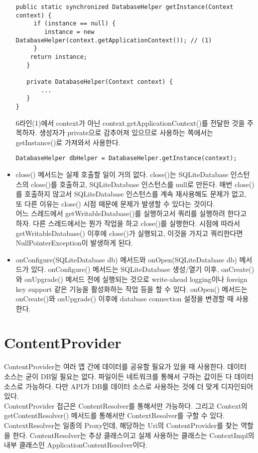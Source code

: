\begin{itemize}
\begin{lstlisting}[frame=single]
  public static synchronized DatabaseHelper getInstance(Context context) {
     if (instance == null) {
        instance = new DatabaseHelper(context.getApplicationContext()); // (1)
     }
    return instance;
   }
 
   private DatabaseHelper(Context context) {
       ...
   }
}
\end{lstlisting}
6라인(1)에서 context가 아닌 context.getApplicationContext()를 전달한 것을 주목하자.
생성자가 private으로 감추어져 있으므로 사용하는 쪽에서는 getInstance()로 가져와서 사용한다.
\begin{lstlisting}[frame=single] 
DatabaseHelper dbHelper = DatabaseHelper.getInstance(context);
\end{lstlisting}

\item close() 메서드는 실제 호출할 일이 거의 없다.
close()는 SQLiteDatabase 인스턴스의 close()를 호출하고, SQLiteDatabase 인스턴스를 null로 만든다.  매번 close()를 호출하지 않고서 SQLiteDatabase 인스턴스를 계속 재사용해도 문제가 없고, 또 다른 이유는 close() 시점 때문에 문제가 발생할 수 있다는 것이다.\\

어느 스레드에서 getWritableDatabase()를 실행하고서 쿼리를 실행하려 한다고 하자. 다른 스레드에서는 뭔가 작업을 하고 close()를 실행한다. 시점에 따라서 getWritableDatabase() 이후에 close()가 실행되고, 이것을 가지고 쿼리한다면  NullPointerException이 발생하게 된다. 
\item onConfigure(SQLiteDatabase db) 메서드와 onOpen(SQLiteDatabase db) 메서드가 있다. onConfigure() 메서드는 SQLiteDatabase 생성/열기 이후, onCreate()와 onUpgrade() 메서드 전에 실행되는 것으로 write-ahead logging이나 foreign key support 같은 기능을 활성화하는 작업 등을 할 수 있다. onOpen() 메서드는 onCreate()와 onUpgrade() 이후에 database connection 설정을 변경할 때 사용한다.

\end{itemize}

\section{ContentProvider}
ContentProvider는 여러 앱 간에 데이터를 공유할 필요가 있을 때 사용한다. 데이터 소스는 굳이 DB일 필요는 없다. 파일이든 네트워크를 통해서 구하는 값이든 다 데이터 소스로 가능하다. 다만 API가 DB를 데이터 소스로 사용하는 것에 더 맞게 디자인되어 있다.\\

ContentProvider 접근은 ContentResolver를 통해서만 가능하다. 그리고 Context의 getContentResolver() 메서드를 통해서만 ContextResolver를 구할 수 있다.  
ContextResolver는 일종의 Proxy인데, 해당하는 Uri의 ContentProvider를 찾는 역할을 한다.
ContentResolver는 추상 클래스이고 실제 사용하는 클래스는 ContextImpl의 내부 클래스인 ApplicationContentResolver이다.

